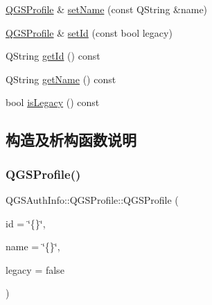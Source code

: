 \begin{DoxyCompactItemize}
\item 
\mbox{\hyperlink{class_q_g_s_auth_info_1_1_q_g_s_profile}{Q\+G\+S\+Profile}} \& \mbox{\hyperlink{class_q_g_s_auth_info_1_1_q_g_s_profile_a3af139e77366c41125fca6097ed1ff81}{set\+Name}} (const Q\+String \&name)
\item 
\mbox{\hyperlink{class_q_g_s_auth_info_1_1_q_g_s_profile}{Q\+G\+S\+Profile}} \& \mbox{\hyperlink{class_q_g_s_auth_info_1_1_q_g_s_profile_ac6ca5600246812d06f11c0975c651752}{set\+Id}} (const bool legacy)
\item 
Q\+String \mbox{\hyperlink{class_q_g_s_auth_info_1_1_q_g_s_profile_a030cff0e64c04ee3ba4d27b6a25f0f2f}{get\+Id}} () const
\item 
Q\+String \mbox{\hyperlink{class_q_g_s_auth_info_1_1_q_g_s_profile_a4919334671b58fa09d31291295b72880}{get\+Name}} () const
\item 
bool \mbox{\hyperlink{class_q_g_s_auth_info_1_1_q_g_s_profile_a5f2c7d248caff7d14256f1efbd6a6f61}{is\+Legacy}} () const
\end{DoxyCompactItemize}


\subsection{构造及析构函数说明}
\mbox{\label{class_q_g_s_auth_info_1_1_q_g_s_profile_ab0d43094da12e31ecb4a5eef7a5fd823}} 
\subsubsection{\texorpdfstring{Q\+G\+S\+Profile()}{QGSProfile()}\hspace{0.1cm}{\footnotesize\ttfamily [1/3]}}
{\footnotesize\ttfamily Q\+G\+S\+Auth\+Info\+::\+Q\+G\+S\+Profile\+::\+Q\+G\+S\+Profile (\begin{DoxyParamCaption}\item[{const Q\+String \&}]{id = {\ttfamily \char`\"{}\{\}\char`\"{}},  }\item[{const Q\+String}]{name = {\ttfamily \char`\"{}\{\}\char`\"{}},  }\item[{const bool}]{legacy = {\ttfamily false} }\end{DoxyParamCaption})}

